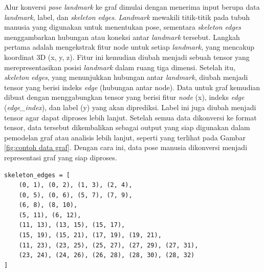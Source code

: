 Alur konversi \textit{pose landmark} ke graf dimulai dengan menerima input berupa data \textit{landmark}, label, dan \textit{skeleton edges}. \textit{Landmark} mewakili titik-titik pada tubuh manusia yang digunakan untuk menentukan pose, sementara \textit{skeleton edges} menggambarkan hubungan atau koneksi antar \textit{landmark } tersebut. Langkah pertama adalah mengekstrak fitur node untuk setiap \textit{landmark}, yang mencakup koordinat 3D (x, y, z). Fitur ini kemudian diubah menjadi sebuah tensor yang merepresentasikan posisi \textit{landmark} dalam ruang tiga dimensi. Setelah itu, \textit{skeleton edges}, yang menunjukkan hubungan antar \textit{landmark}, diubah menjadi tensor yang berisi indeks \textit{edge} (hubungan antar node). Data untuk graf kemudian dibuat dengan menggabungkan tensor yang berisi fitur \textit{node} (x), indeks \textit{edge} (\textit{edge\_index}), dan label (y) yang akan diprediksi. Label ini juga diubah menjadi tensor agar dapat diproses lebih lanjut. Setelah semua data dikonversi ke format tensor, data tersebut dikembalikan sebagai output yang siap digunakan dalam pemodelan graf atau analisis lebih lanjut, seperti yang terlihat pada Gambar \ref{fig:contoh data graf}. Dengan cara ini, data pose manusia dikonversi menjadi representasi graf yang siap diproses. \par


\begin{lstlisting}[caption={Inisialisasi struktur \textit{skeleton}}, label={kode:skeleton edges}]
skeleton_edges = [
    (0, 1), (0, 2), (1, 3), (2, 4),
    (0, 5), (0, 6), (5, 7), (7, 9),
    (6, 8), (8, 10),
    (5, 11), (6, 12),
    (11, 13), (13, 15), (15, 17),
    (15, 19), (15, 21), (17, 19), (19, 21),
    (11, 23), (23, 25), (25, 27), (27, 29), (27, 31),
    (23, 24), (24, 26), (26, 28), (28, 30), (28, 32)
]
\end{lstlisting}

\vspace{10pt}

